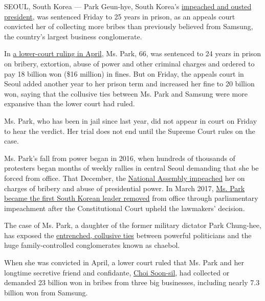 SEOUL, South Korea --- Park Geun-hye, South Korea's
\href{https://www.nytimes.com/2017/03/09/world/asia/park-geun-hye-impeached-south-korea.html?action=click\&contentCollection=Asia\%20Pacific\&module=RelatedCoverage\&region=EndOfArticle\&pgtype=article}{impeached
and ousted president}, was sentenced Friday to 25 years in prison, as an
appeals court convicted her of collecting more bribes than previously
believed from Samsung, the country's largest business conglomerate.

In
\href{https://www.nytimes.com/2018/04/06/world/asia/park-geun-hye-south-korea.html}{a
lower-court ruling in April}, Ms. Park, 66, was sentenced to 24 years in
prison on bribery, extortion, abuse of power and other criminal charges
and ordered to pay 18 billion won (\$16 million) in fines. But on
Friday, the appeals court in Seoul added another year to her prison term
and increased her fine to 20 billion won, saying that the collusive ties
between Ms. Park and Samsung were more expansive than the lower court
had ruled.

Ms. Park, who has been in jail since last year, did not appear in court
on Friday to hear the verdict. Her trial does not end until the Supreme
Court rules on the case.

Ms. Park's fall from power began in 2016, when hundreds of thousands of
protesters began months of weekly rallies in central Seoul demanding
that she be forced from office. That December, the
\href{https://www.nytimes.com/2016/12/09/world/asia/south-korea-president-park-geun-hye-impeached.html}{National
Assembly impeached} her on charges of bribery and abuse of presidential
power. In March 2017,
\href{https://www.nytimes.com/2017/03/09/world/asia/park-geun-hye-impeached-south-korea.html?action=click\&contentCollection=Asia\%20Pacific\&module=RelatedCoverage\&region=EndOfArticle\&pgtype=article}{Ms.
Park became the first South Korean leader removed} from office through
parliamentary impeachment after the Constitutional Court upheld the
lawmakers' decision.

The case of Ms. Park, a daughter of the former military dictator Park
Chung-hee, has exposed the
\href{https://www.nytimes.com/2017/01/02/world/asia/south-korea-park-geun-hye-samsung.html}{entrenched,
collusive ties} between powerful politicians and the huge
family-controlled conglomerates known as chaebol.

When she was convicted in April, a lower court ruled that Ms. Park and
her longtime secretive friend and confidante,
\href{https://www.nytimes.com/2016/11/01/world/asia/south-korea-park-geun-hye-choi-soon-sil.html}{Choi
Soon-sil}, had collected or demanded 23 billion won in bribes from three
big businesses, including nearly 7.3 billion won from Samsung.


